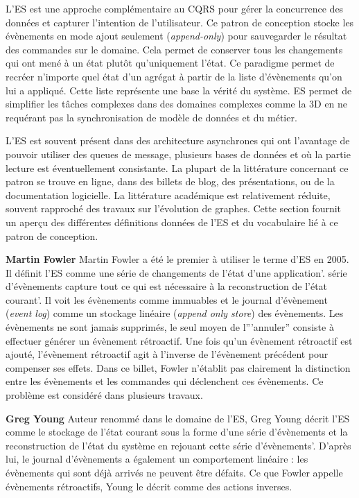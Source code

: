 L'\gls{ES} est une approche complémentaire au \gls{CQRS} pour 
gérer la 
concurrence des données et capturer l'intention de l'utilisateur. Ce patron de 
conception stocke les évènements en mode ajout seulement 
(\textit{append-only}) pour sauvegarder le résultat des commandes sur le 
domaine. Cela permet de conserver tous les changements qui ont mené à un 
état plutôt qu'uniquement l'état. Ce paradigme permet de recréer n'importe quel 
état d'un agrégat à partir de la liste d'évènements qu'on lui a appliqué. Cette 
liste représente une base la vérité du système. 
\gls{ES} permet de simplifier les tâches complexes dans des 
domaines complexes comme la 3D en ne requérant pas la synchronisation de 
modèle de données et du métier. 

L'\gls{ES} est souvent présent dans des architecture asynchrones qui ont 
l'avantage de pouvoir utiliser des queues de message, plusieurs bases de 
données et où la partie lecture est éventuellement consistante.
La plupart de la littérature concernant ce patron se trouve en ligne, dans des 
billets de blog, des présentations, ou de la documentation logicielle. La 
littérature académique est relativement réduite, souvent rapproché des travaux 
sur l'évolution de graphes. Cette section fournit un aperçu des différentes 
définitions données de l'\gls{ES} et du vocabulaire lié à ce patron de conception.

\textbf{Martin Fowler} Martin Fowler a été le premier à utiliser le terme 
d'\acrlong{ES} en 2005. Il définit l'\gls{ES} comme \og une série de 
changements 
de l'état d'une application\fg{}'.  \og série d'évènements capture tout ce qui est 
nécessaire à la reconstruction de l'état courant'\fg{}. Il voit les évènements 
comme 
immuables et le journal d'évènement (\textit{event log}) comme un stockage 
linéaire (\textit{append only store}) des évènements. Les évènements ne sont 
jamais supprimés, le seul moyen de l'''annuler'' consiste à effectuer générer un 
évènement rétroactif. Une fois qu'un évènement rétroactif est ajouté, 
l'évènement 
rétroactif agit à l'inverse de l'évènement précédent pour compenser ses effets. 
Dans ce billet, Fowler n'établit pas clairement la distinction entre les 
évènements 
et les commandes qui déclenchent ces évènements. Ce problème est 
considéré 
dans plusieurs travaux.

\textbf{Greg Young} Auteur renommé dans le domaine de l'\gls{ES}, Greg 
Young décrit l'\gls{ES} comme \og le stockage de l'état courant sous la forme 
d'une série d'évènements et la reconstruction de l'état du système en rejouant 
cette série d'évènements'\fg{}. D'après lui, le journal d'évènements a également 
un comportement linéaire : les évènements qui sont déjà arrivés ne peuvent 
être défaits. Ce que Fowler appelle évènements rétroactifs, Young le décrit 
comme des actions inverses.


